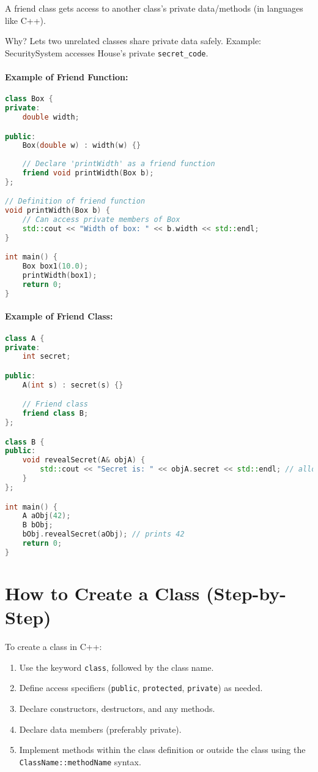 \documentclass[a4paper,12pt]{article}
\begin{document}
A friend class gets access to another class’s private data/methods (in languages like C++).

Why? Lets two unrelated classes share private data safely.
Example: SecuritySystem accesses House’s private \verb|secret_code|.

\paragraph{Example of Friend Function:}

\begin{lstlisting}[language=C++]
class Box {
private:
    double width;

public:
    Box(double w) : width(w) {}
    
    // Declare 'printWidth' as a friend function
    friend void printWidth(Box b);
};

// Definition of friend function
void printWidth(Box b) {
    // Can access private members of Box
    std::cout << "Width of box: " << b.width << std::endl;
}

int main() {
    Box box1(10.0);
    printWidth(box1);
    return 0;
}
\end{lstlisting}

\paragraph{Example of Friend Class:}

\begin{lstlisting}[language=C++]
class A {
private:
    int secret;

public:
    A(int s) : secret(s) {}

    // Friend class
    friend class B;
};

class B {
public:
    void revealSecret(A& objA) {
        std::cout << "Secret is: " << objA.secret << std::endl; // allowed because B is a friend of A
    }
};

int main() {
    A aObj(42);
    B bObj;
    bObj.revealSecret(aObj); // prints 42
    return 0;
}
\end{lstlisting}

\section{How to Create a Class (Step-by-Step)}
To create a class in C++:
\begin{enumerate}
    \item Use the keyword \texttt{class}, followed by the class name.
    \item Define access specifiers (\texttt{public}, \texttt{protected}, \texttt{private}) as needed.
    \item Declare constructors, destructors, and any methods.
    \item Declare data members (preferably private).
    \item Implement methods within the class definition or outside the class using the \texttt{ClassName::methodName} syntax.
\end{enumerate}
\end{document}
